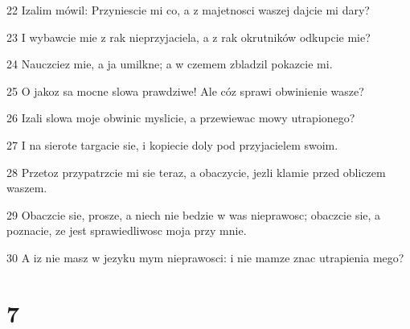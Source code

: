 \par 22 Izalim mówil: Przyniescie mi co, a z majetnosci waszej dajcie mi dary?
\par 23 I wybawcie mie z rak nieprzyjaciela, a z rak okrutników odkupcie mie?
\par 24 Nauczciez mie, a ja umilkne; a w czemem zbladzil pokazcie mi.
\par 25 O jakoz sa mocne slowa prawdziwe! Ale cóz sprawi obwinienie wasze?
\par 26 Izali slowa moje obwinic myslicie, a przewiewac mowy utrapionego?
\par 27 I na sierote targacie sie, i kopiecie doly pod przyjacielem swoim.
\par 28 Przetoz przypatrzcie mi sie teraz, a obaczycie, jezli klamie przed obliczem waszem.
\par 29 Obaczcie sie, prosze, a niech nie bedzie w was nieprawosc; obaczcie sie, a poznacie, ze jest sprawiedliwosc moja przy mnie.
\par 30 A iz nie masz w jezyku mym nieprawosci: i nie mamze znac utrapienia mego?

\chapter{7}

